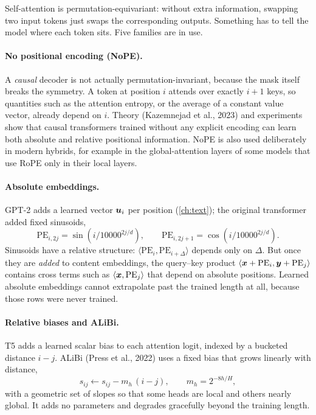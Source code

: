 Self-attention is permutation-equivariant: without extra information, swapping two input tokens just swaps
the corresponding outputs. Something has to tell the model where each token sits. Five families are in use.

\paragraph{No positional encoding (NoPE).} A \emph{causal} decoder is not actually permutation-invariant,
because the mask itself breaks the symmetry. A token at position $i$ attends over exactly $i+1$ keys, so
quantities such as the attention entropy, or the average of a constant value vector, already depend on
$i$. Theory (Kazemnejad et al., 2023) and experiments show that causal transformers trained without any
explicit encoding can learn both absolute and relative positional information. NoPE is also used
deliberately in modern hybrids, for example in the global-attention layers of some models that use RoPE
only in their local layers.

\paragraph{Absolute embeddings.} GPT-2 adds a learned vector $\bm{u}_i$ per position
(\cref{ch:text}); the original transformer added fixed sinusoids,
\[
\mathrm{PE}_{i,2j}=\sin(i/10000^{2j/d}),\qquad \mathrm{PE}_{i,2j+1}=\cos(i/10000^{2j/d}).
\]
Sinusoids have a relative structure: $\langle\mathrm{PE}_i,\mathrm{PE}_{i+\Delta}\rangle$ depends only on
$\Delta$. But once they are \emph{added} to content embeddings, the query--key product
$\langle\bm{x}+\mathrm{PE}_i,\bm{y}+\mathrm{PE}_j\rangle$ contains cross terms such as
$\langle\bm{x},\mathrm{PE}_j\rangle$ that depend on absolute positions. Learned absolute embeddings
cannot extrapolate past the trained length at all, because those rows were never trained.

\paragraph{Relative biases and ALiBi.} T5 adds a learned scalar bias to each attention logit, indexed by a
bucketed distance $i-j$. ALiBi (Press et al., 2022) uses a fixed bias that grows linearly with distance,
\[
s_{ij} \leftarrow s_{ij} - m_h\,(i-j),\qquad m_h = 2^{-8h/H},
\]
with a geometric set of slopes so that some heads are local and others nearly global. It adds no parameters
and degrades gracefully beyond the training length.

